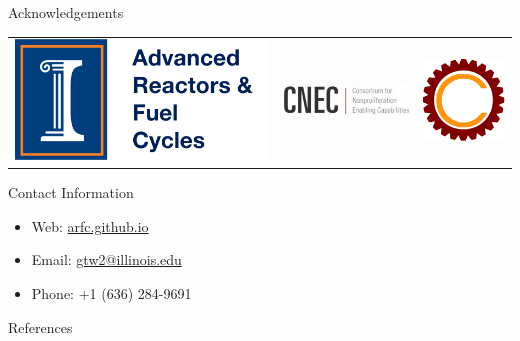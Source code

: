 \documentclass[final]{beamer}
\newlength{\onecolwid}
\newlength{\threecolwid}
\begin{document}
\begin{frame}[t]
\begin{columns}[t,totalwidth=\threecolwid]
\begin{column}{\onecolwid}
\begin{block}{Acknowledgements}
	\vspace{10mm}
	\begin{center}
		\begin{tabular}{ccc}
			\includegraphics[width=0.3\linewidth]{logo.png} & \includegraphics[width=0.3\linewidth]{cnec_oldlogo.png}
			& \includegraphics[width=0.15\linewidth]{cyclus.png}
		\end{tabular}
	\end{center}
	
	
\end{block}





\begin{alertblock}{Contact Information}
	\begin{itemize}
		
		\item Web: \href{arfc.github.io}{arfc.github.io}
		\item Email: \href{mailto:gtw2@illinois.edu}{gtw2@illinois.edu}
		\item Phone: +1 (636) 284-9691
	\end{itemize}
	
\end{alertblock}

\begin{block}{References}

        {\footnotesize 
        }
\end{block}





\end{column} %

\end{columns} %

\end{frame} %
\end{document}
